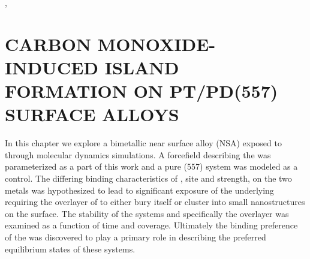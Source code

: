, 
\chapter{CARBON MONOXIDE-INDUCED ISLAND FORMATION ON PT/PD(557) SURFACE ALLOYS}
\label{chap:island}




In this chapter we explore a bimetallic  near surface alloy (NSA)
exposed to  through molecular dynamics simulations. A forcefield
describing the  was parameterized as a part of this work and
a pure  (557) system was modeled as a control. The differing binding
characteristics of , site and strength, on the two metals was
hypothesized to lead to significant exposure of the underlying 
requiring the overlayer of  to either bury itself or cluster into small
nanostructures on the surface. The stability of the systems and specifically
the  overlayer was examined as a function of time and  coverage.
Ultimately the binding preference of the  was discovered to play a
primary role in describing the preferred equilibrium states of these systems.



